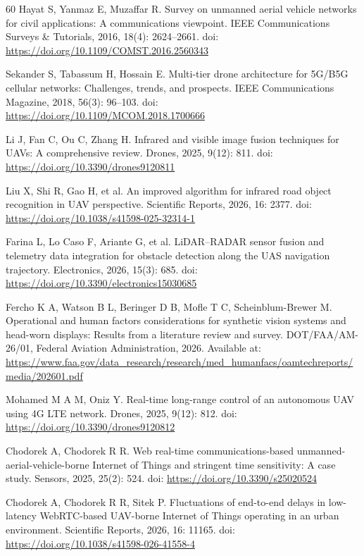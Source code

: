 \documentclass[fleqn]{VRIH2025}
\begin{document}
\begin{thebibliography}{60}
Hayat S, Yanmaz E, Muzaffar R. Survey on unmanned aerial vehicle networks for civil applications: A communications viewpoint. IEEE Communications Surveys \& Tutorials, 2016, 18(4): 2624--2661. doi: \url{https://doi.org/10.1109/COMST.2016.2560343}

Sekander S, Tabassum H, Hossain E. Multi-tier drone architecture for 5G/B5G cellular networks: Challenges, trends, and prospects. IEEE Communications Magazine, 2018, 56(3): 96--103. doi: \url{https://doi.org/10.1109/MCOM.2018.1700666}

Li J, Fan C, Ou C, Zhang H. Infrared and visible image fusion techniques for UAVs: A comprehensive review. Drones, 2025, 9(12): 811. doi: \url{https://doi.org/10.3390/drones9120811}

Liu X, Shi R, Gao H, et al. An improved algorithm for infrared road object recognition in UAV perspective. Scientific Reports, 2026, 16: 2377. doi: \url{https://doi.org/10.1038/s41598-025-32314-1}

Farina L, Lo Caso F, Ariante G, et al. LiDAR--RADAR sensor fusion and telemetry data integration for obstacle detection along the UAS navigation trajectory. Electronics, 2026, 15(3): 685. doi: \url{https://doi.org/10.3390/electronics15030685}

Fercho K A, Watson B L, Beringer D B, Mofle T C, Scheinblum-Brewer M. Operational and human factors considerations for synthetic vision systems and head-worn displays: Results from a literature review and survey. DOT/FAA/AM-26/01, Federal Aviation Administration, 2026. Available at: \url{https://www.faa.gov/data_research/research/med_humanfacs/oamtechreports/media/202601.pdf}

Mohamed M A M, Oniz Y. Real-time long-range control of an autonomous UAV using 4G LTE network. Drones, 2025, 9(12): 812. doi: \url{https://doi.org/10.3390/drones9120812}

Chodorek A, Chodorek R R. Web real-time communications-based unmanned-aerial-vehicle-borne Internet of Things and stringent time sensitivity: A case study. Sensors, 2025, 25(2): 524. doi: \url{https://doi.org/10.3390/s25020524}

Chodorek A, Chodorek R R, Sitek P. Fluctuations of end-to-end delays in low-latency WebRTC-based UAV-borne Internet of Things operating in an urban environment. Scientific Reports, 2026, 16: 11165. doi: \url{https://doi.org/10.1038/s41598-026-41558-4}


\end{thebibliography}
\end{document}
